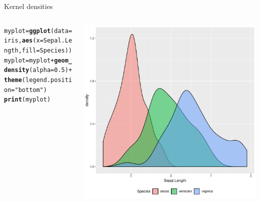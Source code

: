\documentclass[aspectratio=169]{beamer}\usepackage[]{graphicx}\usepackage[]{color}
\makeatletter
\def\maxwidth{ %
  \ifdim\Gin@nat@width>\linewidth
    \linewidth
  \else
    \Gin@nat@width
  \fi
}
\newcommand{\hlnum}[1]{\textcolor[rgb]{0.686,0.059,0.569}{#1}}%
\newcommand{\hlstr}[1]{\textcolor[rgb]{0.192,0.494,0.8}{#1}}%
\newcommand{\hlopt}[1]{\textcolor[rgb]{0,0,0}{#1}}%
\newcommand{\hlstd}[1]{\textcolor[rgb]{0.345,0.345,0.345}{#1}}%
\newcommand{\hlkwb}[1]{\textcolor[rgb]{0.69,0.353,0.396}{#1}}%
\newcommand{\hlkwc}[1]{\textcolor[rgb]{0.333,0.667,0.333}{#1}}%
\newcommand{\hlkwd}[1]{\textcolor[rgb]{0.737,0.353,0.396}{\textbf{#1}}}%
\newenvironment{kframe}{%
 \def\at@end@of@kframe{}%
 \ifinner\ifhmode%
  \def\at@end@of@kframe{\end{minipage}}%
  \begin{minipage}{\columnwidth}%
 \fi\fi%
 \def\FrameCommand##1{\hskip\@totalleftmargin \hskip-\fboxsep
 \colorbox{shadecolor}{##1}\hskip-\fboxsep
     \hskip-\linewidth \hskip-\@totalleftmargin \hskip\columnwidth}%
 \MakeFramed {\advance\hsize-\width
   \@totalleftmargin\z@ \linewidth\hsize
   \@setminipage}}%
 {\par\unskip\endMakeFramed%
 \at@end@of@kframe}
\newenvironment{knitrout}{}{} %
\makeatother
\begin{document}
\begin{frame}[fragile]{Kernel densities}
\begin{columns}
  \begin{column}{0.50\textwidth}
\begin{knitrout}\tiny
{}\color{fgcolor}\begin{kframe}
\begin{alltt}
\hlstd{myplot} \hlkwb{=} \hlkwd{ggplot}\hlstd{(}\hlkwc{data}\hlstd{=iris,} \hlkwd{aes}\hlstd{(}\hlkwc{x}\hlstd{=Sepal.Length,} \hlkwc{fill}\hlstd{=Species))}
\hlstd{myplot} \hlkwb{=} \hlstd{myplot} \hlopt{+} \hlkwd{geom_density}\hlstd{(}\hlkwc{alpha}\hlstd{=}\hlnum{0.5}\hlstd{)} \hlopt{+}
  \hlkwd{theme}\hlstd{(}\hlkwc{legend.position}\hlstd{=}\hlstr{"bottom"}\hlstd{)}
\hlkwd{print}\hlstd{(myplot)}
\end{alltt}
\end{kframe}
\end{knitrout}
  \end{column}
  \begin{column}{0.5\textwidth}
\begin{knitrout}\scriptsize
{}\color{fgcolor}
\includegraphics[width=\maxwidth]{figure/unnamed-chunk-19-1} 

\end{knitrout}
  \end{column}
\end{columns}
\end{frame}
\end{document}
